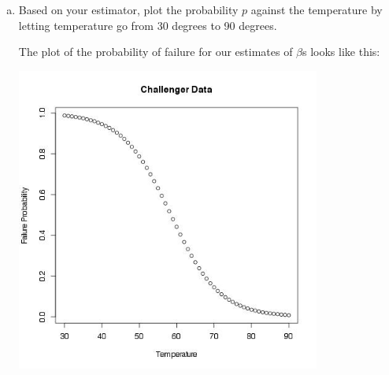 \documentclass[12pt]{article}
\begin{document}
\begin{enumerate}[(a)]
\item Based on your estimator, plot the probability $p$ against the temperature by letting temperature go from 30 degrees to 90 degrees.

The plot of the probability of failure for our estimates of $\beta$s looks like this:

\begin{center}
\includegraphics[width=10cm, height=10cm]{prob_vs_temp_plot_challenger}
\end{center}

\end{enumerate}
\end{document}

